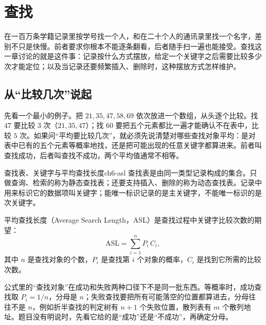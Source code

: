 \section{查找}

在一百万条学籍记录里按学号找一个人，和在二十个人的通讯录里找一个名字，差别不只是快慢。前者要求你根本不能逐条翻看，后者随手扫一遍也能接受。查找这一章讨论的就是这件事：记录按什么方式摆放，给定一个关键字之后需要比较多少次才能定位；以及当记录还要频繁插入、删除时，这种摆放方式怎样维护。

\subsection{从“比较几次”说起}

先看一个最小的例子。把 $21,35,47,58,69$ 依次放进一个数组，从头逐个比较。找 $47$ 要比较 $3$ 次（$21,35,47$）；找 $60$ 要把五个元素都比一遍才能确认不在表中，比较 $5$ 次。如果问“平均要比较几次”，就必须先说清楚对哪些查找对象平均：是对表中已有的五个元素等概率地找，还是把可能出现的任意关键字都算进来。前者叫查找成功，后者叫查找不成功，两个平均值通常不相等。

\begin{mydef}{查找表、关键字与平均查找长度}{ch6-asl}
查找表是由同一类型记录构成的集合。只做查询、检索的称为静态查找表；还要支持插入、删除的称为动态查找表。记录中用来标识它的数据项叫关键字；能唯一标识记录的是主关键字，不能唯一标识的是次关键字。

平均查找长度（Average Search Length，ASL）是查找过程中关键字比较次数的期望：
\[
\mathrm{ASL}=\sum_{i=1}^{n}P_i\,C_i,
\]
其中 $n$ 是查找对象的个数，$P_i$ 是查找第 $i$ 个对象的概率，$C_i$ 是找到它所需的比较次数。
\end{mydef}

公式里的“查找对象”在成功和失败两种口径下不是同一批东西。等概率时，成功查找取 $P_i=1/n$，分母是 $n$；失败查找要把所有可能落空的位置都算进去，分母往往不是 $n$，例如折半查找的判定树有 $n+1$ 个失败位置，散列表有 $m$ 个散列地址。题目没有明说时，先看它给的是“成功”还是“不成功”，再确定分母。

\begin{center}
\end{center}

